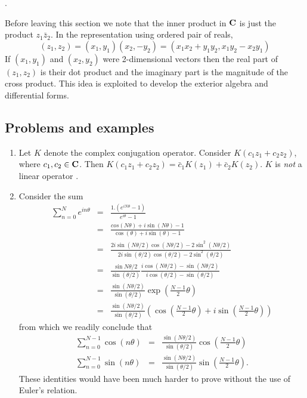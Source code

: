{\color{red}{Add Lagrange's identity}}.

Before leaving this section we note that the inner product in $\mathbf{C}$ is just
the product $z_1\bar{z}_2$. In the representation using ordered pair of reals,
\[
(z_1, z_2) = (x_1, y_1)(x_2, -y_2) = (x_1x_2 + y_1y_2, x_1y_2 - x_2y_1)
\]
If $(x_1, y_1)$ and $(x_2, y_2)$ were 2-dimensional vectors then the real part
of $(z_1, z_2)$ is their dot product and the imaginary part is the magnitude of
the cross product. This idea is exploited to develop the exterior algebra and
differential forms.

\subsection{Problems and examples}
\begin{enumerate}
\item Let $K$ denote the complex conjugation operator. Consider $K(c_1z_1 + 
c_2z_2)$, where $c_1, c_2 \in \mathbf{C}$. Then $K(c_1z_1 + c_2z_2) = \bar{c}_1K(z_1)
+ \bar{c}_2K(z_2)$. $K$ is \emph{not} a linear operator \cite{aw}.

\item Consider the sum \cite{aw}
\begin{eqnarray*}
\sum_{n=0}^N e^{in\theta} &=& \frac{1.(e^{iN\theta} - 1)}{e^{i\theta} - 1} \\
 &=& \frac{cos(N\theta)+i\sin(N\theta)-1}{\cos(\theta) + i\sin(\theta) - 1} \\
 &=& \frac{2i\sin(N\theta/2)\cos(N\theta/2) - 2\sin^2(N\theta/2)}
     {2i\sin(\theta/2)\cos(\theta/2) - 2\sin^2(\theta/2)} \\
 &=& \frac{\sin{N\theta/2}}{\sin(\theta/2)}
     \frac{i\cos(N\theta/2)-\sin(N\theta/2)}{i\cos(\theta/2)-\sin(\theta/2)} \\
 &=& \frac{\sin{(N\theta/2)}}{\sin(\theta/2)}
     \exp\left(\frac{N-1}{2}\theta\right) \\
 &=& \frac{\sin{(N\theta/2)}}{\sin(\theta/2)}\left(
     \cos\left(\frac{N-1}{2}\theta\right)+i\sin\left(\frac{N-1}{2}\theta\right)
     \right)
\end{eqnarray*}
from which we readily conclude that
\begin{eqnarray}
\sum_{n=0}^{N-1}\cos(n\theta) &=& \frac{\sin{(N\theta/2)}}{\sin(\theta/2)}
                                  \cos\left(\frac{N-1}{2}\theta\right)  
                                  \label{c1s3e12} \\
\sum_{n=0}^{N-1}\sin(n\theta) &=& \frac{\sin{(N\theta/2)}}{\sin(\theta/2)}
                                  \sin\left(\frac{N-1}{2}\theta\right).
								  \label{c1s3e13}
\end{eqnarray}
These identities would have been much harder to prove without the use of 
Euler's relation.


\end{enumerate}
